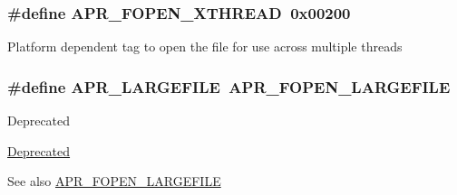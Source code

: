 \subsubsection[{\texorpdfstring{A\+P\+R\+\_\+\+F\+O\+P\+E\+N\+\_\+\+X\+T\+H\+R\+E\+AD}{APR_FOPEN_XTHREAD}}]{\setlength{\rightskip}{0pt plus 5cm}\#define A\+P\+R\+\_\+\+F\+O\+P\+E\+N\+\_\+\+X\+T\+H\+R\+E\+AD~0x00200}\hypertarget{group__apr__file__open__flags_ga435cd9b2604b11796779c23ffa00a3dd}{}\label{group__apr__file__open__flags_ga435cd9b2604b11796779c23ffa00a3dd}
Platform dependent tag to open the file for use across multiple threads 
\subsubsection[{\texorpdfstring{A\+P\+R\+\_\+\+L\+A\+R\+G\+E\+F\+I\+LE}{APR_LARGEFILE}}]{\setlength{\rightskip}{0pt plus 5cm}\#define A\+P\+R\+\_\+\+L\+A\+R\+G\+E\+F\+I\+LE~{\bf A\+P\+R\+\_\+\+F\+O\+P\+E\+N\+\_\+\+L\+A\+R\+G\+E\+F\+I\+LE}}\hypertarget{group__apr__file__open__flags_gaafa04fd4ec71910a5d7af1c7f5596bad}{}\label{group__apr__file__open__flags_gaafa04fd4ec71910a5d7af1c7f5596bad}
\begin{DoxyRefDesc}{Deprecated}
\item[\hyperlink{deprecated__deprecated000030}{Deprecated}]\end{DoxyRefDesc}
\begin{DoxySeeAlso}{See also}
\hyperlink{group__apr__file__open__flags_gaf6cfaa4789e6264afd186235f0adbc22}{A\+P\+R\+\_\+\+F\+O\+P\+E\+N\+\_\+\+L\+A\+R\+G\+E\+F\+I\+LE} 
\end{DoxySeeAlso}
